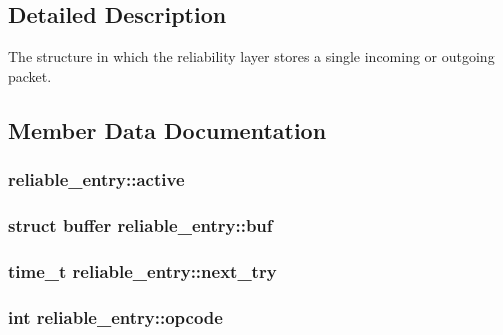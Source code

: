 \subsection{Detailed Description}
The structure in which the reliability layer stores a single incoming or outgoing packet. 

\subsection{Member Data Documentation}
\hypertarget{structreliable__entry_ae7ed12ee1ab459520fd71aa86bb1484a}{}
\subsubsection[{active}]{ reliable\+\_\+entry\+::active}\label{structreliable__entry_ae7ed12ee1ab459520fd71aa86bb1484a}
\hypertarget{structreliable__entry_a0f522626659a560f3ca41cf46002887c}{}
\subsubsection[{buf}]{\setlength{\rightskip}{0pt plus 5cm}struct {\bf buffer} reliable\+\_\+entry\+::buf}\label{structreliable__entry_a0f522626659a560f3ca41cf46002887c}
\hypertarget{structreliable__entry_a6398a39696991060e2e80155cca8912b}{}
\subsubsection[{next\+\_\+try}]{\setlength{\rightskip}{0pt plus 5cm}time\+\_\+t reliable\+\_\+entry\+::next\+\_\+try}\label{structreliable__entry_a6398a39696991060e2e80155cca8912b}
\hypertarget{structreliable__entry_a34e28012d3f858c2fc727e81fccedc09}{}
\subsubsection[{opcode}]{\setlength{\rightskip}{0pt plus 5cm}int reliable\+\_\+entry\+::opcode}\label{structreliable__entry_a34e28012d3f858c2fc727e81fccedc09}
\hypertarget{structreliable__entry_a82e3388aade524471a76cd51a157d11e}{}
